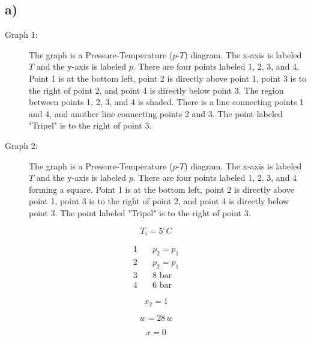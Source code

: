 

\subsection*{a)}

\begin{description}
    \item[Graph 1:] 
    The graph is a Pressure-Temperature ($p$-$T$) diagram. The x-axis is labeled $T$ and the y-axis is labeled $p$. There are four points labeled 1, 2, 3, and 4. Point 1 is at the bottom left, point 2 is directly above point 1, point 3 is to the right of point 2, and point 4 is directly below point 3. The region between points 1, 2, 3, and 4 is shaded. There is a line connecting points 1 and 4, and another line connecting points 2 and 3. The point labeled "Tripel" is to the right of point 3.
    
    \item[Graph 2:] 
    The graph is a Pressure-Temperature ($p$-$T$) diagram. The x-axis is labeled $T$ and the y-axis is labeled $p$. There are four points labeled 1, 2, 3, and 4 forming a square. Point 1 is at the bottom left, point 2 is directly above point 1, point 3 is to the right of point 2, and point 4 is directly below point 3. The point labeled "Tripel" is to the right of point 3.
\end{description}

\[
T_i = 5^\circ C
\]

\begin{align*}
1 & \quad p_{2} = p_{1} \\
2 & \quad p_{2} = p_{1} \\
3 & \quad 8 \text{ bar} \\
4 & \quad 6 \text{ bar}
\end{align*}

\[
x_2 = 1
\]

\[
w = 28 \, w
\]

\[
x = 0
\]